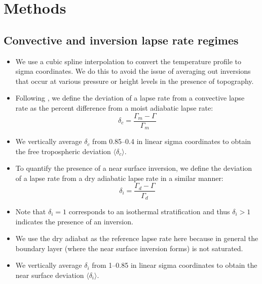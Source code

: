 \documentclass{ametsocV5}
\begin{document}
\section{Methods}

\subsection{Convective and inversion lapse rate regimes}
\begin{itemize}
  \item We use a cubic spline interpolation to convert the temperature profile to sigma coordinates. We do this to avoid the issue of averaging out inversions that occur at various pressure or height levels in the presence of topography.
  \item Following \cite{stone1979}, we define the deviation of a lapse rate from a convective lapse rate as the percent difference from a moist adiabatic lapse rate:
        \begin{equation}
          \delta_{c} = \frac{\Gamma_{m}-\Gamma}{\Gamma_{m}}
        \end{equation}
  \item We vertically average \(\delta_{c}\) from 0.85--0.4 in linear sigma coordinates to obtain the free tropospheric deviation \(\langle \delta_{c} \rangle\).
  \item To quantify the presence of a near surface inversion, we define the deviation of a lapse rate from a dry adiabatic lapse rate in a similar manner:
        \begin{equation}
          \delta_{i} = \frac{\Gamma_{d}-\Gamma}{\Gamma_{d}}
        \end{equation}
  \item Note that \(\delta_{i}=1\) corresponds to an isothermal stratification and thus \(\delta_{i}>1\) indicates the presence of an inversion.
  \item We use the dry adiabat as the reference lapse rate here because in general the boundary layer (where the near surface inversion forms) is not saturated.
  \item We vertically average \(\delta_{i}\) from 1--0.85 in linear sigma coordinates to obtain the near surface deviation \(\langle \delta_{i} \rangle\).
\end{itemize}
\end{document}
